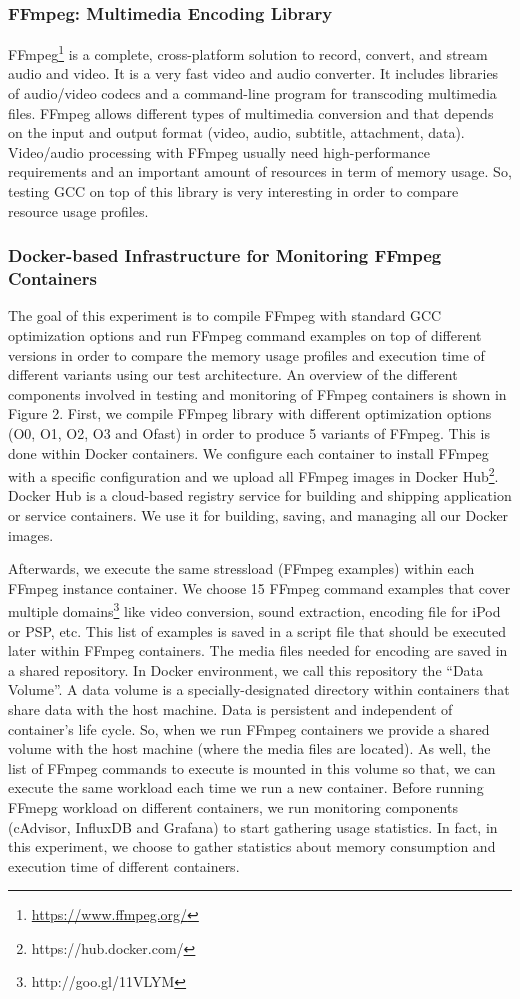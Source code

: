 \subsubsection{FFmpeg: Multimedia Encoding Library}
FFmpeg\footnote{\url{https://www.ffmpeg.org/}} is a complete, cross-platform solution to record, convert, and stream audio and video. It is a very fast video and audio converter. It includes libraries of audio/video codecs and a command-line program for transcoding multimedia files. FFmpeg allows different types of multimedia conversion and that depends on the input and output format (video, audio, subtitle, attachment, data). Video/audio processing with FFmpeg usually need high-performance requirements and an important amount of resources in term of memory usage. So, testing GCC on top of this library is very interesting in order to compare resource usage profiles. 
\subsubsection{Docker-based Infrastructure for Monitoring FFmpeg Containers}


The goal of this experiment is to compile FFmpeg with standard GCC optimization options and run FFmpeg command examples on top of different versions in order to compare the memory usage profiles and execution time of different variants using our test architecture. An overview of the different components involved in testing and monitoring of FFmpeg containers is shown in Figure 2. 
First, we compile FFmpeg library with different optimization options  (O0, O1, O2, O3 and Ofast) in order to produce 5 variants of FFmpeg. This is done within Docker containers. We configure each container to install FFmpeg with a specific configuration and we upload all FFmpeg images in Docker Hub\footnote{https://hub.docker.com/}.
Docker Hub is a cloud-based registry service for building and shipping application or service containers. We use it for building, saving, and managing all our Docker images.

Afterwards, we execute the same stressload (FFmpeg examples) within each FFmpeg instance container. We choose 15 FFmpeg command examples that cover multiple domains\footnote{http://goo.gl/11VLYM} like video conversion, sound extraction, encoding file for iPod or PSP, etc. This list of examples is saved in a script file that should be executed later within FFmpeg containers. The media files needed for encoding are saved in a shared repository. In Docker environment, we call this repository the “Data Volume”. A data volume is a specially-designated directory within containers that share data with the host machine. Data is persistent and independent of container's life cycle. So, when we run FFmpeg containers we provide a shared volume with the host machine (where the media files are located). As well, the list of FFmpeg commands to execute is mounted in this volume so that, we can execute the same workload each time we run a new container.
Before running FFmepg workload on different containers, we run monitoring components (cAdvisor, InfluxDB and Grafana) to start gathering usage statistics.
In fact, in this experiment, we choose to gather statistics about memory consumption and execution time of different containers. 

